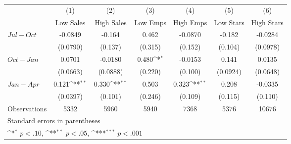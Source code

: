 {
\def\sym#1{\ifmmode^{#1}\else\(^{#1}\)\fi}
\begin{tabular}{l*{6}{c}}
\hline\hline
                    &\multicolumn{1}{c}{(1)}&\multicolumn{1}{c}{(2)}&\multicolumn{1}{c}{(3)}&\multicolumn{1}{c}{(4)}&\multicolumn{1}{c}{(5)}&\multicolumn{1}{c}{(6)}\\
                    &\multicolumn{1}{c}{Low Sales}&\multicolumn{1}{c}{High Sales}&\multicolumn{1}{c}{Low Emps}&\multicolumn{1}{c}{High Emps}&\multicolumn{1}{c}{Low Stars}&\multicolumn{1}{c}{High Stars}\\
\hline
$ Jul-Oct $         &     -0.0849         &      -0.164         &       0.462         &     -0.0870         &      -0.182         &     -0.0284         \\
                    &    (0.0790)         &     (0.137)         &     (0.315)         &     (0.152)         &     (0.104)         &    (0.0978)         \\
[1em]
$ Oct-Jan $         &      0.0701         &     -0.0180         &       0.480\sym{*}  &     -0.0153         &       0.141         &      0.0135         \\
                    &    (0.0663)         &    (0.0888)         &     (0.220)         &     (0.100)         &    (0.0924)         &    (0.0648)         \\
[1em]
$ Jan-Apr $         &       0.121\sym{**} &       0.330\sym{**} &       0.503         &       0.323\sym{**} &       0.208         &     -0.0335         \\
                    &    (0.0397)         &     (0.101)         &     (0.246)         &     (0.109)         &     (0.115)         &     (0.110)         \\
\hline
Observations        &        5332         &        5960         &        5940         &        7368         &        5376         &       10676         \\
\hline\hline
\multicolumn{7}{l}{\footnotesize Standard errors in parentheses}\\
\multicolumn{7}{l}{\footnotesize \sym{*} \(p<.10\), \sym{**} \(p<.05\), \sym{***} \(p<.001\)}\\
\end{tabular}
}
